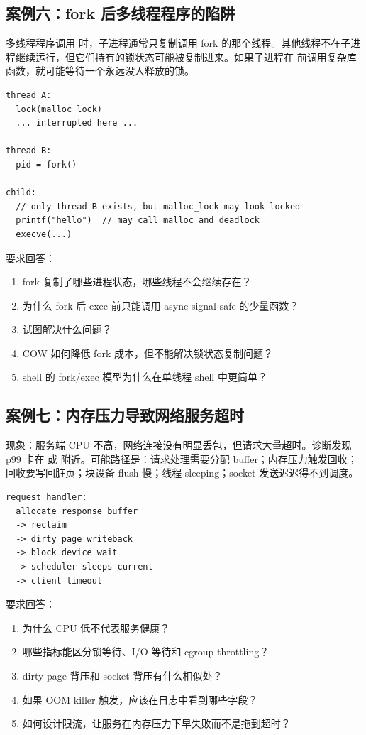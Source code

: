 \subsection{案例六：fork 后多线程程序的陷阱}

多线程程序调用  时，子进程通常只复制调用 fork 的那个线程。其他线程不在子进程继续运行，但它们持有的锁状态可能被复制进来。如果子进程在  前调用复杂库函数，就可能等待一个永远没人释放的锁。

\begin{lstlisting}
thread A:
  lock(malloc_lock)
  ... interrupted here ...

thread B:
  pid = fork()

child:
  // only thread B exists, but malloc_lock may look locked
  printf("hello")  // may call malloc and deadlock
  execve(...)
\end{lstlisting}

要求回答：

\begin{enumerate}
\tightlist
\item fork 复制了哪些进程状态，哪些线程不会继续存在？
\item 为什么 fork 后 exec 前只能调用 async-signal-safe 的少量函数？
\item {} 试图解决什么问题？
\item COW 如何降低 fork 成本，但不能解决锁状态复制问题？
\item shell 的 fork/exec 模型为什么在单线程 shell 中更简单？
\end{enumerate}

\subsection{案例七：内存压力导致网络服务超时}

现象：服务端 CPU 不高，网络连接没有明显丢包，但请求大量超时。诊断发现 p99 卡在  或  附近。可能路径是：请求处理需要分配 buffer；内存压力触发回收；回收要写回脏页；块设备 flush 慢；线程 sleeping；socket 发送迟迟得不到调度。

\begin{lstlisting}
request handler:
  allocate response buffer
  -> reclaim
  -> dirty page writeback
  -> block device wait
  -> scheduler sleeps current
  -> client timeout
\end{lstlisting}

要求回答：

\begin{enumerate}
\tightlist
\item 为什么 CPU 低不代表服务健康？
\item 哪些指标能区分锁等待、I/O 等待和 cgroup throttling？
\item dirty page 背压和 socket 背压有什么相似处？
\item 如果 OOM killer 触发，应该在日志中看到哪些字段？
\item 如何设计限流，让服务在内存压力下早失败而不是拖到超时？
\end{enumerate}

